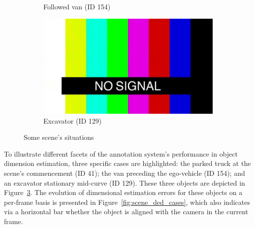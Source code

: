 \begin{figure}[h!]
\begin{subfigure}[b]{0.32\textwidth}
        \caption{Followed van (ID 154)}
        \label{fig:scene_open3d_cases_b}
    \end{subfigure}
    \hfill
    \begin{subfigure}[b]{0.32\textwidth}
        \includegraphics[width=\textwidth]{images/shared/no_signal.jpg}
        \caption{Excavator (ID 129)}
        \label{fig:scene_open3d_cases_c}
    \end{subfigure}
    \caption{Some scene's situations}
    \label{fig:scene_open3d_cases}
\end{figure}

To illustrate different facets of the annotation system's performance in object dimension estimation, three specific cases are highlighted: the parked truck at the scene's commencement (ID 41); the van preceding the ego-vehicle (ID 154); and an excavator stationary mid-curve (ID 129). These three objects are depicted in Figure~\ref{fig:scene_open3d_cases}. The evolution of dimensional estimation errors for these objects on a per-frame basis is presented in Figure~\ref{fig:scene_ded_cases}, which also indicates via a horizontal bar whether the object is aligned with the camera in the current frame.

